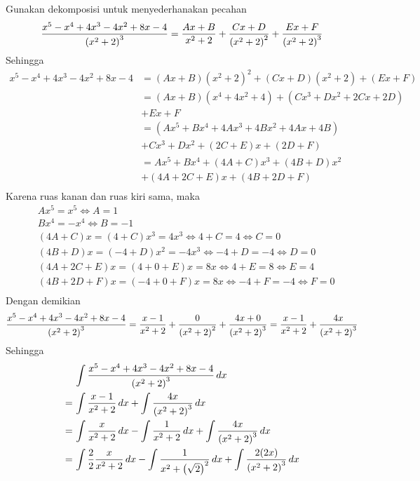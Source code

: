 \begin{enumerate}[leftmargin=*, label={\arabic*}.]
\begin{enumerate}[label={\alph*}.]
    Gunakan dekomposisi untuk menyederhanakan pecahan
    \[
        \frac{x^{5}-x^{4}+4x^{3}-4x^{2}+8x-4}{\brk*{x^{2}+2}^{3}} 
        = \frac{Ax+B}{x^{2}+2} + \frac{Cx+D}{\brk*{x^{2}+2}^{2}} 
        + \frac{Ex+F}{\brk*{x^{2}+2}^{3}}
    \]
    Sehingga
    \begin{align*}
        x^{5}-x^{4}+4x^{3}-4x^{2}+8x-4&=(Ax+B)(x^{2}+2)^{2}+(Cx+D)(x^{2}+2)+(Ex+F)\\
        &=(Ax+B)(x^{4}+4x^{2}+4)+(Cx^{3}+Dx^{2}+2Cx+2D) \\
        &+ Ex+F\\
        &=(Ax^{5}+Bx^{4}+4Ax^{3}+4Bx^{2}+4Ax+4B)\\
        &+Cx^{3}+Dx^{2}+(2C+E)x+(2D+F) \\
        &=Ax^{5}+Bx^{4}+(4A+C)x^{3}+(4B+D)x^{2}\\
        &+(4A+2C+E)x+(4B+2D+F) \\
    \end{align*}
    Karena ruas kanan dan ruas kiri sama, maka
    \begin{align*}
        &Ax^{5} =x^{5} \iff A = 1\\
        &Bx^{4} = -x^{4} \iff B = -1\\
        &(4A+C)x=(4+C)x^{3}=4x^{3} \iff 4+C = 4 \iff C=0\\ 
        &(4B+D)x=(-4+D)x^{2}=-4x^{3} \iff -4+D = -4 \iff D=0\\ 
        &(4A+2C+E)x=(4+0+E)x=8x \iff 4+E = 8 \iff E=4\\ 
        &(4B+2D+F)x=(-4+0+F)x=8x \iff -4+F = -4 \iff F=0\\ 
    \end{align*}
    Dengan demikian
    \[
        \frac{x^{5}-x^{4}+4x^{3}-4x^{2}+8x-4}{\brk*{x^{2}+2}^{3}} 
        = \frac{x-1}{x^{2}+2} + \frac{0}{\brk*{x^{2}+2}^{2}} 
        + \frac{4x+0}{\brk*{x^{2}+2}^{3}}
        = \frac{x-1}{x^{2}+2} + \frac{4x}{\brk*{x^{2}+2}^{3}}
    \]
    Sehingga
    \begin{align*}
        &\int \frac{x^{5}-x^{4}+4x^{3}-4x^{2}+8x-4}{\brk*{x^{2}+2}^{3}}\,dx\\
        =\,&\int \frac{x-1}{x^{2}+2}\,dx + \int \frac{4x}{\brk*{x^{2}+2}^{3}}\,dx\\
        =\,&\int \frac{x}{x^{2}+2}\,dx - \int \frac{1}{x^{2}+2}\,dx 
        + \int \frac{4x}{\brk*{x^{2}+2}^{3}}\,dx\\
        =\,&\int \frac{2}{2}\frac{x}{x^{2}+2}\,dx - \int \frac{1}{x^{2}+\brk*{\sqrt{2}}^{2}}\,dx 
        + \int \frac{2(2x)}{\brk*{x^{2}+2}^{3}}\,dx\\

\end{align*}
\end{enumerate}
\end{enumerate}
